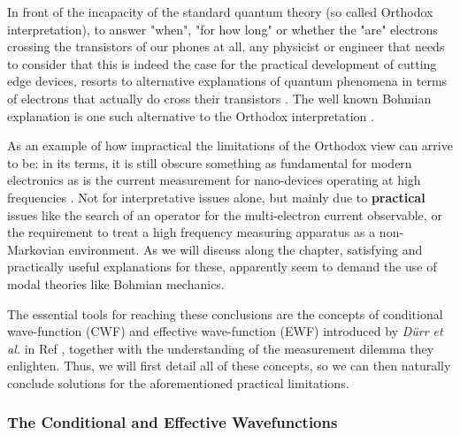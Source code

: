 \documentclass[11pt, a4paper]{article} %
\begin{document}
{}
\setcounter{page}{1}

\hspace*{4mm} In front of the incapacity of the standard quantum theory (so called Orthodox interpretation), to answer "when", "for how long" or whether the "are" electrons crossing the transistors of our phones at all, any physicist or engineer that needs to consider that this is indeed the case for the practical development of cutting edge devices, resorts to alternative explanations of quantum phenomena in terms of electrons that actually do cross their transistors \cite{where}. The well known Bohmian explanation is one such alternative to the Orthodox interpretation \cite{Bohm,Holland, Durr,JordiXavier}. 

As an example of how impractical the limitations of the Orthodox view can arrive to be: in its terms, it is still obscure something as fundamental for modern electronics as is the current measurement for nano-devices operating at high frequencies \cite{Thz}. Not for interpretative issues alone, but mainly due to {\bf practical} issues like the search of an operator for the multi-electron current observable, or the requirement to treat a high frequency measuring apparatus as a non-Markovian environment. As we will discuss along the chapter, satisfying and practically useful explanations for these, apparently seem to demand the use of modal theories like Bohmian mechanics. 

The essential tools for reaching these conclusions are the concepts of conditional wave-function (CWF) and effective wave-function (EWF) introduced by {\em Dürr et al.} in Ref \cite{Absolute}, together with the understanding of the measurement dilemma they enlighten. Thus, we will first detail all of these concepts, so we can then naturally conclude solutions for the aforementioned practical limitations.
\vspace{-0.2cm}

\subsubsection*{The Conditional and Effective Wavefunctions}
\vspace{-0.2cm}
\end{document}
